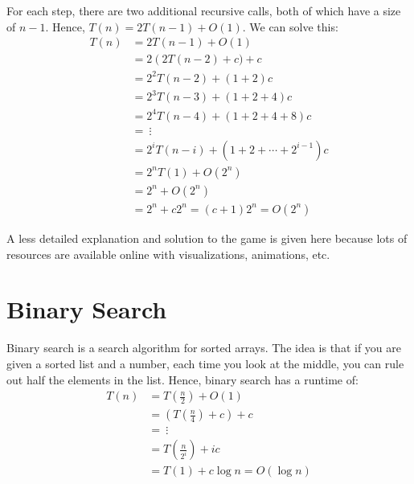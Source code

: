 \documentclass[14pt]{extarticle}
\begin{document}
    For each step, there are two additional recursive calls, both of 
    which have a size of $n - 1$. Hence, $T(n) = 2T(n - 1) + O(1)$.
    We can solve this:
    \begin{align*}
        T(n) &= 2T(n - 1) + O(1)                            \\
             &= 2\left(2T(n - 2) + c) + c                   \\
             &= 2^2T(n - 2) + (1 + 2)c                      \\
             &= 2^3T(n - 3) + (1 + 2 + 4)c                  \\
             &= 2^4T(n - 4) + (1 + 2 + 4 + 8)c              \\
             &= \ \vdots                                    \\
             &= 2^iT(n - i) + (1 + 2 + \cdots + 2^{i-1})c   \\
             &= 2^nT(1) + O(2^n)                            \\
             &= 2^n + O(2^n)                                \\
             &= 2^n + c2^n 
             = (c + 1)2^n = \boxed{O(2^n)}
    \end{align*}
    
    A less detailed explanation and solution to the game is given here because
    lots of resources are available online with visualizations, animations,
    etc.

    \section{Binary Search}
    Binary search is a search algorithm for sorted arrays. The idea is
    that if you are given a sorted list and a number, each time you look
    at the middle, you can rule out half the elements in the list. Hence,
    binary search has a runtime of:
    \begin{align*}
        T(n) &= T\left(\frac{n}{2}\right) + O(1)            \\
             &= \left(
             T\left(\frac{n}{4}\right) + c
            \right) + c                                     \\
             &= \ \vdots                                    \\    
             &= T\left(\frac{n}{2^i}\right) + ic            \\
             &= T(1) + c\log n 
             = O(\log n)
    \end{align*}
    \pagebreak
    
\end{document}
